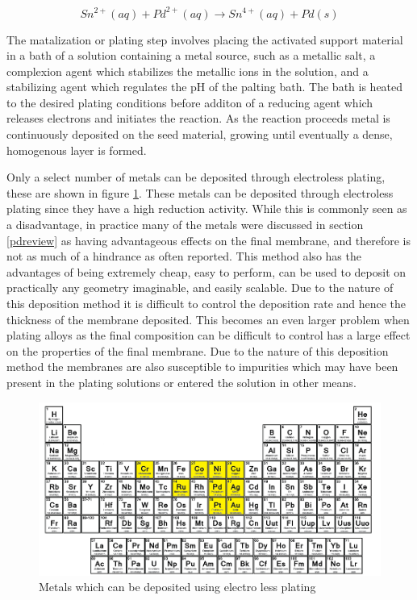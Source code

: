 \begin{equation} \label{stannum}
    Sn^{2+} (aq) + Pd^{2+} (aq) \rightarrow Sn^{4+} (aq) + Pd(s)
\end{equation}

The matalization or plating step involves placing the activated support material in a bath of a solution containing a metal source, such as a metallic salt, a complexion agent which stabilizes the metallic ions in the solution, and a stabilizing agent which regulates the pH of the palting bath. The bath is heated to the desired plating conditions before additon of a reducing agent which releases electrons and initiates the reaction. As the reaction proceeds metal is continuously deposited on the seed material, growing until eventually a dense, homogenous layer is formed. 

Only a select number of metals can be deposited through electroless plating, these are shown in figure \ref{fig:elpmetals}. \cite{Exter2015} These metals can be deposited through electroless plating since they have a high reduction activity. While this is commonly seen as a disadvantage, in practice many of the metals were discussed in section \ref{pdreview} as having advantageous effects on the final membrane, and therefore is not as much of a hindrance as often reported. \cite{Exter2015} This method also has the advantages of being extremely cheap, easy to perform, can be used to deposit on practically any geometry imaginable, and easily scalable. Due to the nature of this deposition method it is difficult to control the deposition rate and hence the thickness of the membrane deposited. This becomes an even larger problem when plating alloys as the final composition can be difficult to control has a large effect on the properties of the final membrane. Due to the nature of this deposition method the membranes are also susceptible to impurities which may have been present in the plating solutions or entered the solution in other means. 

\begin{figure}[H]
    \centering
    \includegraphics{figures/elpmetals.png}
    \caption{Metals which can be deposited using electro less plating  \cite{Exter2015}}
    \label{fig:elpmetals}
\end{figure}

